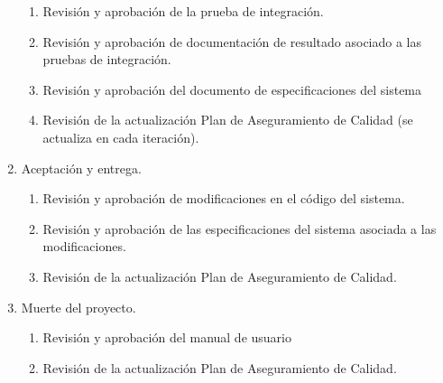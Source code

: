 \begin{enumerate}
\begin{enumerate}
		\item Revisión y aprobación de la prueba de integración. 
		\item Revisión y aprobación de documentación de resultado asociado a las pruebas de integración. 
		\item Revisión y aprobación del documento de especificaciones del sistema
		\item Revisión de la actualización Plan de Aseguramiento de Calidad (se actualiza en cada iteración).
	\end{enumerate}
	\item Aceptación y entrega.
	\begin{enumerate} 
		\item Revisión y aprobación de modificaciones en el código del sistema.
		\item Revisión y aprobación de las especificaciones del sistema asociada a las modificaciones.
		\item Revisión de la actualización Plan de Aseguramiento de Calidad.
	\end{enumerate}
	\item Muerte del proyecto.
	\begin{enumerate}
		\item Revisión y aprobación del manual de usuario
		\item Revisión de la actualización Plan de Aseguramiento de Calidad.
	\end{enumerate}
\end{enumerate}